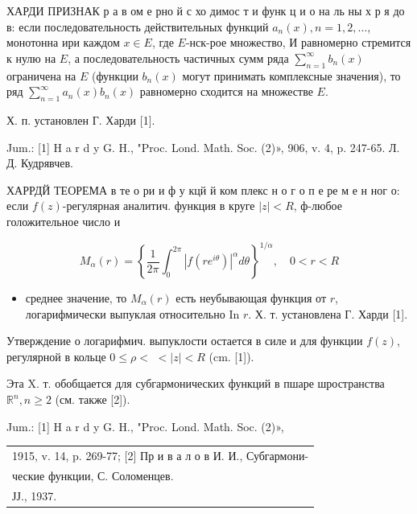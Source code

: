 \documentclass[10pt]{article}
\begin{document}
ХАРДИ ПРИЗНАК р а в ом е рно й с хо димос т и функ ц и о на ль ны х р я до в: если последовательность действительных функций $a_{n}(x), n=1,2, \ldots$, монотонна ири каждом $x \in E$, где $E$-нск-рое множество, И равномерно стремится к нулю на $E$, а последовательность частичных сумм ряда $\sum_{n=1}^{\infty} b_{n}(x)$ ограничена на $E$ (функции $b_{n}(x)$ могут принимать комплексные значения), то ряд $\sum_{n=1}^{\infty} a_{n}(x) b_{n}(x)$ равномерно сходится на множестве $E$.



Х. п. установлен Г. Харди [1].



Jum.: [1] H a r d y G. H., "Proc. Lond. Math. Soc. (2)», 906, v. 4, p. 247-65. Л. Д. Кудрявчев.



ХАРРДЙ ТЕОРЕМА в те о ри и ф у кцй й ком плекс н о г о п е ре м е н ног о: если $f(z)$-регулярная аналитич. функция в круге $|z|<R$, ф-любое голожительное число и



\[

M_{\alpha}(r)=\left\{\frac{1}{2 \pi} \int_{0}^{2 \pi}\left|f\left(r e^{i \theta}\right)\right|^{\alpha} d \theta\right\}^{1 / \alpha}, \quad 0<r<R

\]



\begin{itemize}

  \item среднее значение, то $M_{\alpha}(r)$ есть неубывающая функция от $r$, логарифмически выпуклая относительно In $r$. Х. т. установлена Г. Харди [1].

\end{itemize}



Утверждение о логарифмич. выпуклости остается в силе и для функции $f(z)$, регулярной в кольце $0 \leqslant \rho<$ $<|z|<R$ (cm. [1]).



Эта X. т. обобщается для субгармонических функций в пшаре шространства $\mathbb{R}^{n}, n \geqslant 2$ (см. также [2]).



Jum.: [1] H a r d y G. H., "Proc. Lond. Math. Soc. (2)», \begin{tabular}{l}

1915, v. 14, p. 269-77; [2] Пр и в а л о в И. И., Субгармони- \\

ческие функции, С. Соломенцев. \\

\hline

ЈЈ., 1937. \\

\hline

\end{tabular}
\end{document}
